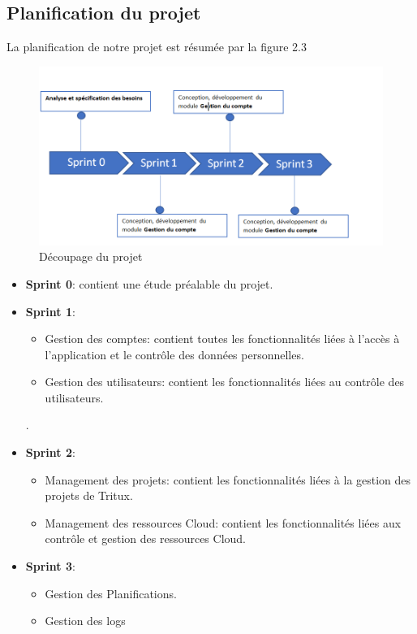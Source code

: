 \subsection{Planification du projet}
La planification de notre projet est résumée par  la figure 2.3
\begin{figure}[h]
	\centering
	\includegraphics[scale=0.5]{decoupageSprint.PNG}
	\caption{Découpage du projet}
	\label{Découpage du projet}
\end{figure}
\begin{itemize}
	\item \textbf{Sprint 0}: contient une étude préalable du projet.
	\item \textbf{Sprint 1}: \begin{itemize}
		\item Gestion des comptes: contient toutes les fonctionnalités liées à l'accès à l'application et le contrôle des données personnelles.
		\item Gestion des utilisateurs: contient les fonctionnalités liées au contrôle des utilisateurs.

	\end{itemize}  .
\item \textbf{Sprint 2}: 
\begin{itemize}
	\item Management des projets: contient les fonctionnalités liées à la gestion des projets de Tritux.
	\item Management des ressources Cloud: contient les fonctionnalités liées aux contrôle et gestion des ressources Cloud.
\end{itemize}
\item \textbf{Sprint 3}:
\begin{itemize}
	\item Gestion des Planifications.
    \item Gestion des logs

\end{itemize}
\end{itemize}

